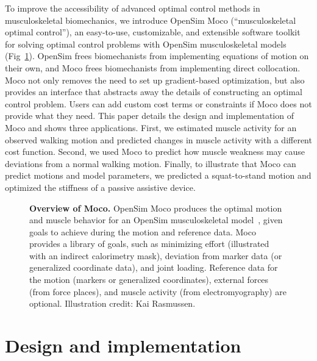 \documentclass[10pt,letterpaper]{article}
\begin{document}
To improve the accessibility of advanced optimal control methods in musculoskeletal biomechanics, we introduce OpenSim Moco (``musculoskeletal optimal control''), an easy-to-use, customizable, and extensible software toolkit for solving optimal control problems with OpenSim musculoskeletal models (Fig~\ref{overviewmoco}). OpenSim frees biomechanists from implementing equations of motion on their own, and Moco frees biomechanists from implementing direct collocation. Moco not only removes the need to set up gradient-based optimization, but also provides an interface that abstracts away the details of constructing an optimal control problem. Users can add custom cost terms or constraints if Moco does not provide what they need. This paper details the design and implementation of Moco and shows three applications. First, we estimated muscle activity for an observed walking motion and predicted changes in muscle activity with a different cost function. Second, we used Moco to predict how muscle weakness may cause deviations from a normal walking motion. Finally, to illustrate that Moco can predict motions and model parameters, we predicted a squat-to-stand motion and optimized the stiffness of a passive assistive device.

\begin{figure}[!h]
    \centering
    \caption{{\bf Overview of Moco.}
        OpenSim Moco produces the optimal motion and muscle behavior for an OpenSim musculoskeletal model~\cite{Seth:2018gg}, given goals to achieve during the motion and reference data. Moco provides a library of goals, such as minimizing effort (illustrated with an indirect calorimetry mask), deviation from marker data (or generalized coordinate data), and joint loading. Reference data for the motion (markers or generalized coordinates), external forces (from force places), and muscle activity (from electromyography) are optional. Illustration credit: Kai Rasmussen.}
    \label{overviewmoco}
\end{figure}

\section*{Design and implementation}
\end{document}
